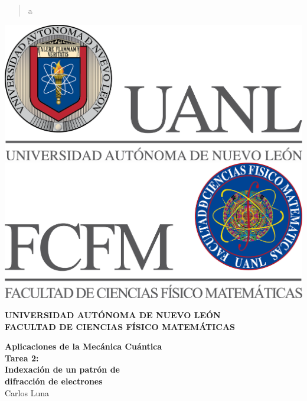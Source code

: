 \documentclass[reprint,amsmath,amssymb,aps,]{revtex4-2}
\begin{document}
\begin{abstract}
a
\end{abstract}
\begin{titlepage}
\begin{center}
\includegraphics[scale=0.40]{../../../Logos/uanl.png} 
\hspace{2.5cm}
\includegraphics[scale=0.40]{../../../Logos/fcfm.png}
\end{center}
\vspace{2cm}
\begin{center}
\textbf{
UNIVERSIDAD AUTÓNOMA DE NUEVO LEÓN\\
FACULTAD DE CIENCIAS
FÍSICO MATEMÁTICAS}\\
\vspace*{2cm}
\begin{large}
\vspace{1cm}
\large{\textbf{Aplicaciones de la Mecánica Cuántica}}\vspace{1.5cm}\\
\textbf{Tarea 2:\\ Indexación de un patrón de \\difracción de electrones}\\
Carlos Luna\\
\end{large}
\vspace{3.5cm}

\end{center}
\end{titlepage}
\end{document}
